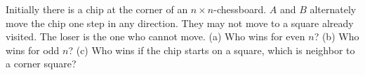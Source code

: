 Initially there is a chip at the corner of an $n \times n$-chessboard. $A$ and $B$ alternately move the chip one step in any direction. They may not move to a square already visited. The loser is the one who cannot move. (a) Who wins for even $n$? (b) Who wins for odd $n$? (c) Who wins if the chip starts on a square, which is neighbor to a corner square?

